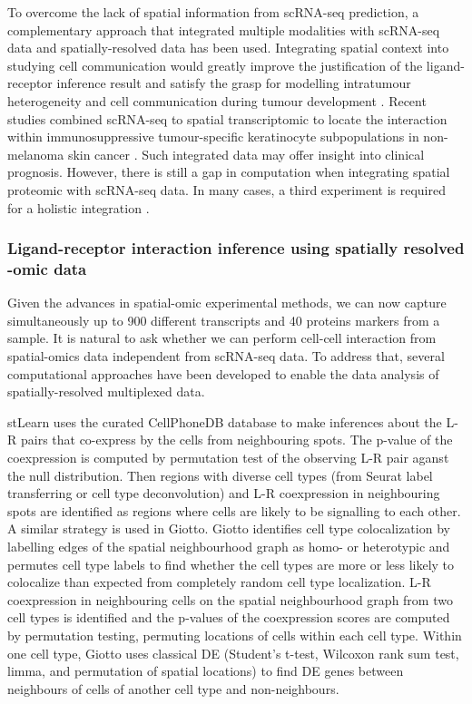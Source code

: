 To overcome the lack of spatial information from scRNA-seq prediction, a complementary approach that integrated multiple modalities with scRNA-seq data and spatially-resolved data has been used. Integrating spatial context into studying cell communication would greatly improve the justification of the ligand-receptor inference result and satisfy the grasp for modelling intratumour heterogeneity and cell communication during tumour development \cite{crosetto2015spatially, pages2010immune, marusyk2012intra,bedard2013tumour}. Recent studies combined scRNA-seq to spatial transcriptomic to locate the interaction within immunosuppressive tumour-specific keratinocyte subpopulations in non-melanoma skin cancer \cite{ji2020multimodal}. Such integrated data may offer insight into clinical prognosis. However, there is still a gap in computation when integrating spatial proteomic with scRNA-seq data. In many cases, a third experiment is required for a holistic integration \cite{ji2020multimodal, schulz2018simultaneous, govek2021single}.    

\subsubsection{Ligand-receptor interaction inference using spatially resolved -omic data}
Given the advances in spatial-omic experimental methods, we can now capture simultaneously up to 900 different transcripts and 40 proteins markers from a sample. It is natural to ask whether we can perform cell-cell interaction from spatial-omics data independent from scRNA-seq data. To address that,  several computational approaches have been developed to enable the data analysis of spatially-resolved multiplexed data. 

stLearn uses the curated CellPhoneDB database to make inferences about the L-R pairs that co-express by the cells from neighbouring spots. The p-value of the coexpression is computed by permutation test of the observing L-R pair aganst the null distribution. Then regions with diverse cell types (from Seurat label transferring or cell type deconvolution) and L-R coexpression in neighbouring spots are identified as regions where cells are likely to be signalling to each other. A similar strategy is used in Giotto. Giotto identifies cell type colocalization by labelling edges of the spatial neighbourhood graph as homo- or heterotypic and permutes cell type labels to find whether the cell types are more or less likely to colocalize than expected from completely random cell type localization. L-R coexpression in neighbouring cells on the spatial neighbourhood graph from two cell types is identified and the p-values of the coexpression scores are computed by permutation testing, permuting locations of cells within each cell type. Within one cell type, Giotto uses classical DE (Student’s t-test, Wilcoxon rank sum test, limma, and permutation of spatial locations) to find DE genes between neighbours of cells of another cell type and non-neighbours.

